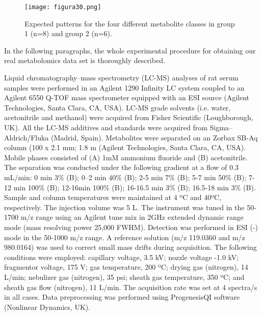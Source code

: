 \begin{figure}[hbtp]
	\centering
\texttt{[image: figura30.png]}
\caption{Expected patterns for the four different metabolite classes in group 1 (n=8) and group 2 (n=6).}
\label{figura30}
\end{figure}

In the following paragraphs, the whole experimental procedure for obtaining our real metabolomics data set is thoroughly described. 

Liquid chromatography–mass spectrometry (LC-MS) analyses of rat serum samples were performed in an Agilent 1290 Infinity LC system coupled to an Agilent 6550 Q-TOF mass spectrometer equipped with an ESI source (Agilent Technologies, Santa Clara, CA, USA). LC-MS grade solvents (i.e. water, acetonitrile and methanol) were acquired from Fisher Scientific (Loughborough, UK). All the LC-MS additives and standards were acquired from Sigma–Aldrich/Fluka (Madrid, Spain). Metabolites were separated on an Zorbax SB-Aq column (100 x 2.1 mm; 1.8 {\textmu}m (Agilent Technologies, Santa Clara, CA, USA). Mobile phases consisted of (A) 1mM ammonium fluoride and (B) acetonitrile. The separation was conducted under the following gradient at a flow of 0.3 mL/min: 0 min 3\% (B); 0–2 min 40\% (B); 2-5 min 7\% (B); 5-7 min 50\% (B); 7-12 min 100\% (B); 12-16min 100\% (B); 16-16.5 min 3\% (B); 16.5-18 min 3\% (B). Sample and column temperatures were maintained at 4 ºC and 40ºC, respectively. The injection volume was 5 {\textmu}L. 
The instrument was tuned in the 50-1700 m/z range using an Agilent tune mix in 2GHz extended dynamic range mode (mass resolving power 25,000 FWHM). Detection was performed in ESI (-) mode in the 50-1000 m/z range. A reference solution (m/z 119.0360 and m/z 980.0164) was used to correct small mass drifts during acquisition. The following conditions were employed: capillary voltage, 3.5 kV; nozzle voltage -1.0 kV; fragmentor voltage, 175 V; gas temperature, 200 ºC; drying gas (nitrogen), 14 L/min; nebulizer gas (nitrogen), 35 psi; sheath gas temperature, 350 ºC; and sheath gas flow (nitrogen), 11 L/min. The acquisition rate was set at 4 spectra/s in all cases. Data preprocessing was performed using ProgenesisQI software (Nonlinear Dynamics, UK).

